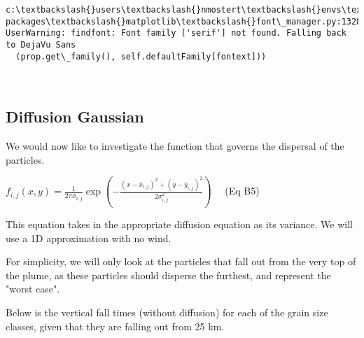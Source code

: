 \documentclass[11pt]{article}
\begin{document}
    \begin{Verbatim}[commandchars=\\\{\}]
c:\textbackslash{}users\textbackslash{}nmostert\textbackslash{}envs\textbackslash{}spew\textbackslash{}lib\textbackslash{}site-packages\textbackslash{}matplotlib\textbackslash{}font\_manager.py:1328: UserWarning: findfont: Font family ['serif'] not found. Falling back to DejaVu Sans
  (prop.get\_family(), self.defaultFamily[fontext]))

    \end{Verbatim}

    \begin{center}
    \end{center}
    { \hspace*{\fill} \\}
    
    \subsection{Diffusion Gaussian}\label{diffusion-gaussian}

We would now like to investigate the function that governs the dispersal
of the particles.

\(f_{i,j}(x,y) = \frac{1}{2\pi\sigma_{i,j}} \exp \left( - \frac{(x - \bar{x}_{i,j})^2 + (y - \bar{y}_{i,j})^2}{2\sigma_{i,j}^2}\right) \quad\)
(Eq B5)

This equation takes in the appropriate diffusion equation as its
variance. We will use a 1D approximation with no wind.

For simplicity, we will only look at the particles that fall out from
the very top of the plume, as these particles should disperse the
furthest, and represent the "worst case".

Below is the vertical fall times (without diffusion) for each of the
grain size classes, given that they are falling out from 25 km.
\end{document}
